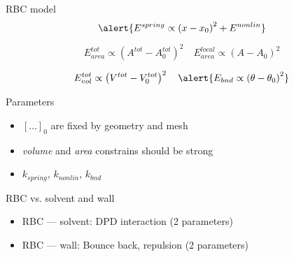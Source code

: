 \begin{frame}
\bcc  
  \bc
  \ec
  \bc
  \ec
\ecc  
\end{frame}

\begin{frame}{RBC model}
\[
  \alert{E^{spring} \propto \left( x - x_0 \right)^2 + E^{nonlin}}
\]

\[
  E^{tot}_{area} \propto \left( A^{tot} - A_{0}^{tot} \right)^2 \quad
  E^{local}_{area} \propto \left( A - A_{0} \right)^2
\]

\[
         E^{tot}_{vol} \propto \left( V^{tot} - V_{0}^{tot} \right)^2 \quad
  \alert{E_{bnd} \propto \left(\theta - \theta_0 \right)^2}
\]

\begin{exampleblock}{Parameters}
  \begin{itemize}
  \item $[\ldots]_0$ are fixed by geometry and mesh
  \item \textit{volume} and \textit{area} constrains should be strong
  \item $k_{spring}$, $k_{nonlin}$, $k_{bnd}$
  \end{itemize}
\end{exampleblock}
\end{frame}

\begin{frame}{RBC vs. solvent and wall}
  \begin{exampleblock}{}
    \begin{itemize}
    \item RBC --- solvent: DPD interaction (2 parameters)
    \item RBC --- wall: Bounce back, repulsion (2 parameters)
    \end{itemize}
  \end{exampleblock}
\end{frame}

